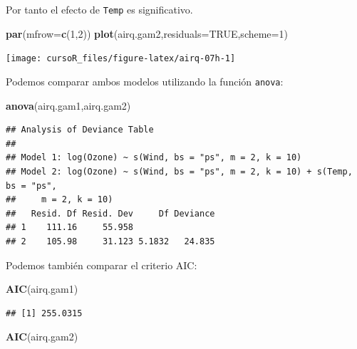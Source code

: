 \documentclass[]{book}
\newenvironment{Shaded}{\begin{snugshade}}{\end{snugshade}}
\newcommand{\KeywordTok}[1]{\textcolor[rgb]{0.13,0.29,0.53}{\textbf{#1}}}
\newcommand{\DataTypeTok}[1]{\textcolor[rgb]{0.13,0.29,0.53}{#1}}
\newcommand{\DecValTok}[1]{\textcolor[rgb]{0.00,0.00,0.81}{#1}}
\newcommand{\OtherTok}[1]{\textcolor[rgb]{0.56,0.35,0.01}{#1}}
\newcommand{\NormalTok}[1]{#1}
\begin{document}
Por tanto el efecto de \texttt{Temp} es significativo.

\begin{Shaded}
\begin{Highlighting}[]
\KeywordTok{par}\NormalTok{(}\DataTypeTok{mfrow=}\KeywordTok{c}\NormalTok{(}\DecValTok{1}\NormalTok{,}\DecValTok{2}\NormalTok{))}
\KeywordTok{plot}\NormalTok{(airq.gam2,}\DataTypeTok{residuals=}\OtherTok{TRUE}\NormalTok{,}\DataTypeTok{scheme=}\DecValTok{1}\NormalTok{)}
\end{Highlighting}
\end{Shaded}

\begin{center}\texttt{[image: cursoR\_files/figure-latex/airq-07h-1]} \end{center}

Podemos comparar ambos modelos utilizando la función \texttt{anova}:

\begin{Shaded}
\begin{Highlighting}[]
\KeywordTok{anova}\NormalTok{(airq.gam1,airq.gam2)}
\end{Highlighting}
\end{Shaded}

\begin{verbatim}
## Analysis of Deviance Table
## 
## Model 1: log(Ozone) ~ s(Wind, bs = "ps", m = 2, k = 10)
## Model 2: log(Ozone) ~ s(Wind, bs = "ps", m = 2, k = 10) + s(Temp, bs = "ps", 
##     m = 2, k = 10)
##   Resid. Df Resid. Dev     Df Deviance
## 1    111.16     55.958                
## 2    105.98     31.123 5.1832   24.835
\end{verbatim}

Podemos también comparar el criterio AIC:

\begin{Shaded}
\begin{Highlighting}[]
\KeywordTok{AIC}\NormalTok{(airq.gam1)}
\end{Highlighting}
\end{Shaded}

\begin{verbatim}
## [1] 255.0315
\end{verbatim}

\begin{Shaded}
\begin{Highlighting}[]
\KeywordTok{AIC}\NormalTok{(airq.gam2)}
\end{Highlighting}
\end{Shaded}
\end{document}

